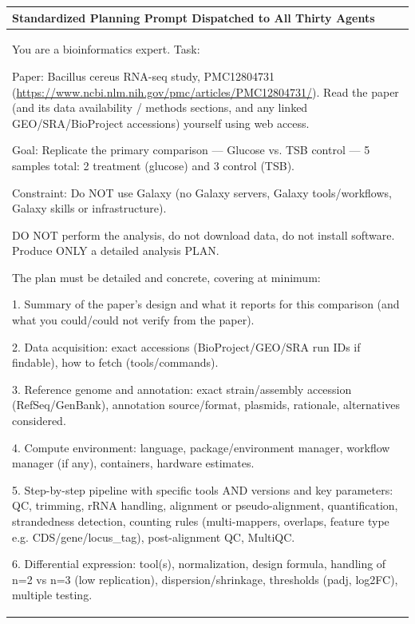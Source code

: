 \documentclass[11pt,letterpaper]{article}
\begin{document}
\begin{table}[!htbp]
\centering
\footnotesize
\begin{tabularx}{\textwidth}{X}
\toprule
\textbf{Standardized Planning Prompt Dispatched to All Thirty Agents} \\
\midrule
You are a bioinformatics expert. Task: \par\vspace{0.4em}
Paper: Bacillus cereus RNA-seq study, PMC12804731 (\url{https://www.ncbi.nlm.nih.gov/pmc/articles/PMC12804731/}). Read the paper (and its data availability / methods sections, and any linked GEO/SRA/BioProject accessions) yourself using web access. \par\vspace{0.4em}
Goal: Replicate the primary comparison --- Glucose vs. TSB control --- 5 samples total: 2 treatment (glucose) and 3 control (TSB). \par
Constraint: Do NOT use Galaxy (no Galaxy servers, Galaxy tools/workflows, Galaxy skills or infrastructure). \par\vspace{0.4em}
DO NOT perform the analysis, do not download data, do not install software. Produce ONLY a detailed analysis PLAN. \par\vspace{0.4em}
The plan must be detailed and concrete, covering at minimum: \par
1. Summary of the paper's design and what it reports for this comparison (and what you could/could not verify from the paper). \par
2. Data acquisition: exact accessions (BioProject/GEO/SRA run IDs if findable), how to fetch (tools/commands). \par
3. Reference genome and annotation: exact strain/assembly accession (RefSeq/GenBank), annotation source/format, plasmids, rationale, alternatives considered. \par
4. Compute environment: language, package/environment manager, workflow manager (if any), containers, hardware estimates. \par
5. Step-by-step pipeline with specific tools AND versions and key parameters: QC, trimming, rRNA handling, alignment or pseudo-alignment, quantification, strandedness detection, counting rules (multi-mappers, overlaps, feature type e.g. CDS/gene/locus\_tag), post-alignment QC, MultiQC. \par
6. Differential expression: tool(s), normalization, design formula, handling of n=2 vs n=3 (low replication), dispersion/shrinkage, thresholds (padj, log2FC), multiple testing. \par

\end{tabularx}
\end{table}
\end{document}
